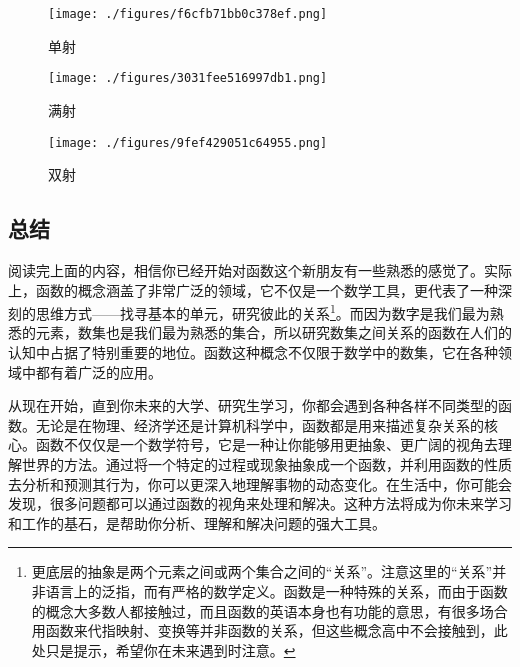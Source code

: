 \begin{figure}[ht]
\centering
\texttt{[image: ./figures/f6cfb71bb0c378ef.png]}
\caption{单射}\label{fig_functi_2}
\end{figure}
\begin{figure}[ht]
\centering
\texttt{[image: ./figures/3031fee516997db1.png]}
\caption{满射} \label{fig_functi_3}
\end{figure}
\begin{figure}[ht]
\centering
\texttt{[image: ./figures/9fef429051c64955.png]}
\caption{双射} \label{fig_functi_4}
\end{figure}
\subsection{总结}

阅读完上面的内容，相信你已经开始对函数这个新朋友有一些熟悉的感觉了。实际上，函数的概念涵盖了非常广泛的领域，它不仅是一个数学工具，更代表了一种深刻的思维方式——找寻基本的单元，研究彼此的关系\footnote{更底层的抽象是两个元素之间或两个集合之间的“关系”。注意这里的“关系”并非语言上的泛指，而有严格的数学定义。函数是一种特殊的关系，而由于函数的概念大多数人都接触过，而且函数的英语本身也有功能的意思，有很多场合用函数来代指映射、变换等并非函数的关系，但这些概念高中不会接触到，此处只是提示，希望你在未来遇到时注意。}。而因为数字是我们最为熟悉的元素，数集也是我们最为熟悉的集合，所以研究数集之间关系的函数在人们的认知中占据了特别重要的地位。函数这种概念不仅限于数学中的数集，它在各种领域中都有着广泛的应用。

从现在开始，直到你未来的大学、研究生学习，你都会遇到各种各样不同类型的函数。无论是在物理、经济学还是计算机科学中，函数都是用来描述复杂关系的核心。函数不仅仅是一个数学符号，它是一种让你能够用更抽象、更广阔的视角去理解世界的方法。通过将一个特定的过程或现象抽象成一个函数，并利用函数的性质去分析和预测其行为，你可以更深入地理解事物的动态变化。在生活中，你可能会发现，很多问题都可以通过函数的视角来处理和解决。这种方法将成为你未来学习和工作的基石，是帮助你分析、理解和解决问题的强大工具。
